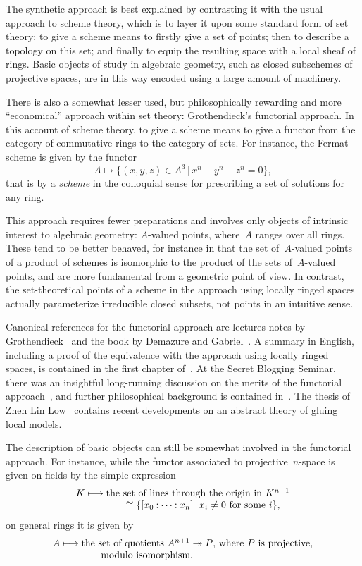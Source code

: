 \documentclass[10pt,reqno,a4paper]{amsbook}
\theoremstyle{definition}
\theoremstyle{plain}
\theoremstyle{remark}
\newcommand{\?}{\,{:}\,}
\newcommand{\hg}{\mathbin{:}}  %
\renewcommand{\_}{\mathpunct{.}\,}
\begin{document}
{The synthetic approach is best explained by contrasting it with the usual
approach to scheme theory, which is to layer it upon some standard form of set theory:
to give a scheme means to firstly give a set of points; then
to describe a topology on this set; and finally to equip the resulting space
with a local sheaf of rings. Basic objects of study in algebraic geometry, such
as closed subschemes of projective spaces, are in this way encoded using a large
amount of machinery.

There is also a somewhat lesser used, but philosophically rewarding and more
``economical'' approach within set theory: Grothendieck's functorial approach.
In this account of scheme theory, to give a scheme means to give a functor
from the category of commutative rings to the category of sets. For instance,
the Fermat scheme is given by the functor
\[ A \longmapsto \{ (x,y,z) \in A^3 \,|\, x^n + y^n - z^n = 0 \}, \]
that is by a \emph{scheme} in the colloquial sense for prescribing a set of
solutions for any ring.

This approach requires fewer preparations and involves
only objects of intrinsic interest to algebraic geometry: $A$-valued points,
where~$A$ ranges over all rings. These tend to be better behaved, for instance in
that the set of~$A$-valued points of a product of schemes is isomorphic to the
product of the sets of~$A$-valued points, and are more fundamental from a
geometric point of view. In contrast, the set-theoretical points of a scheme in
the approach using locally ringed spaces actually parameterize irreducible
closed subsets, not points in an intuitive sense.

Canonical references for the functorial approach are lectures notes by
Gro\-then\-dieck~\cite{grothendieck:functorial-ag} and the book by Demazure and
Gabriel~\cite{demazure:gabriel}. A summary in English, including a proof of the
equivalence with the approach using locally ringed spaces, is contained in the
first chapter of~\cite{vezzani:fun}. At the Secret Blogging Seminar, there was
an insightful long-running discussion on the merits of the functorial
approach~\cite{secret-blogging-seminar:fpov}, and further philosophical background
is contained in~\cite{mclarty:ontology}. The thesis of Zhen Lin Low~\cite{low:local-models}
contains recent developments on an abstract theory of gluing local models.

The description of basic objects can still be somewhat involved in the
functorial approach. For instance, while the functor associated to
projective~$n$-space is given on fields by the simple expression
\[ \begin{array}{r@{}c@{}l}
  K &{}\longmapsto{}& \text{the set of lines through the origin in~$K^{n+1}$} \\
  && \qquad \cong \{ [x_0 \hg \cdots \hg x_n] \,|\, \text{$x_i \neq 0$ for some~$i$} \},
\end{array} \]
on general rings it is given by
\[ \begin{array}{r@{}c@{}l}
  A &{}\longmapsto{}& \text{the set of quotients~$A^{n+1} \twoheadrightarrow P$,
  where~$P$ is projective,} \\
  && \qquad \text{modulo isomorphism}.
\end{array} \]

}
\end{document}
